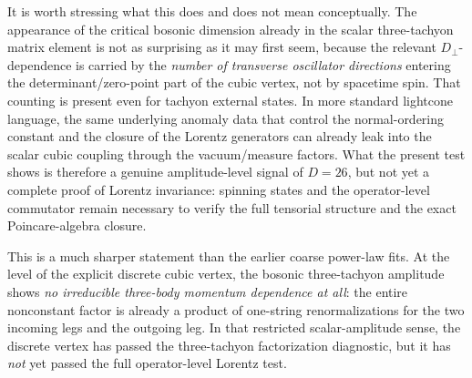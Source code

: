 \documentclass[11pt]{article}
\numberwithin{equation}{section}
\newcommand{\perpD}{D_\perp}
\begin{document}
It is worth stressing what this does and does not mean conceptually. The appearance of the critical bosonic dimension already in the scalar three-tachyon matrix element is not as surprising as it may first seem, because the relevant $\perpD$-dependence is carried by the \emph{number of transverse oscillator directions} entering the determinant/zero-point part of the cubic vertex, not by spacetime spin. That counting is present even for tachyon external states. In more standard lightcone language, the same underlying anomaly data that control the normal-ordering constant and the closure of the Lorentz generators can already leak into the scalar cubic coupling through the vacuum/measure factors. What the present test shows is therefore a genuine amplitude-level signal of $D=26$, but not yet a complete proof of Lorentz invariance: spinning states and the operator-level commutator remain necessary to verify the full tensorial structure and the exact Poincare-algebra closure.

This is a much sharper statement than the earlier coarse power-law fits. At the level of the explicit discrete cubic vertex, the bosonic three-tachyon amplitude shows \emph{no irreducible three-body momentum dependence at all}: the entire nonconstant factor is already a product of one-string renormalizations for the two incoming legs and the outgoing leg. In that restricted scalar-amplitude sense, the discrete vertex has passed the three-tachyon factorization diagnostic, but it has \emph{not} yet passed the full operator-level Lorentz test.
\end{document}
